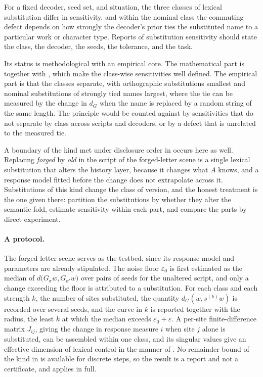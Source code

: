 \begin{principle}\label{pr:lexclasses}
For a fixed decoder, seed set, and situation, the three classes of lexical substitution differ in sensitivity, and within the nominal class the commuting defect depends on how strongly the decoder's prior ties the substituted name to a particular work or character type. Reports of substitution sensitivity should state the class, the decoder, the seeds, the tolerance, and the task.
\end{principle}

Its status is methodological with an empirical core. The mathematical part is  together with , which make the class-wise sensitivities well defined. The empirical part is that the classes separate, with orthographic substitutions smallest and nominal substitutions of strongly tied names largest, where the tie can be measured by the change in $d_G$ when the name is replaced by a random string of the same length. The principle would be counted against by sensitivities that do not separate by class across scripts and decoders, or by a defect that is unrelated to the measured tie.

A boundary of the kind met under disclosure order in  occurs here as well. Replacing \emph{forged} by \emph{old} in the script of the forged-letter scene is a single lexical substitution that alters the history layer, because it changes what $A$ knows, and a response model fitted before the change does not extrapolate across it. Substitutions of this kind change the class of version, and the honest treatment is the one given there: partition the substitutions by whether they alter the semantic fold, estimate sensitivity within each part, and compare the parts by direct experiment.

\paragraph{A protocol.} The forged-letter scene serves as the testbed, since its response model and parameters are already stipulated. The noise floor $\varepsilon_0$ is first estimated as the median of $d\bigl(G_\sigma w,G_{\sigma'}w\bigr)$ over pairs of seeds for the unaltered script, and only a change exceeding the floor is attributed to a substitution. For each class and each strength $k$, the number of sites substituted, the quantity $d_G(w,s^{(k)}w)$ is recorded over several seeds, and the curve in $k$ is reported together with the radius, the least $k$ at which the median exceeds $\varepsilon_0+\varepsilon$. A per-site finite-difference matrix $J_{ij}$, giving the change in response measure $i$ when site $j$ alone is substituted, can be assembled within one class, and its singular values give an effective dimension of lexical control in the manner of . No remainder bound of the kind in  is available for discrete steps, so the result is a report and not a certificate, and  applies in full.

